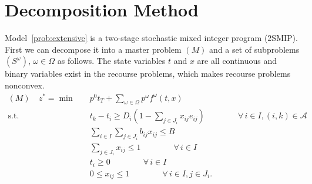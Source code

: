 \documentclass[11pt]{article}
\begin{document}
	\section{Decomposition Method} \label{sec:decomposition}
	Model~\eqref{prob:extensive} is a two-stage stochastic mixed integer program (2SMIP). First we can decompose it into a master problem \((M)\) and a set of subproblems \((S^\omega)\), \(\omega \in \Omega\) as follows. The state variables \(t\) and \(x\) are all continuous and binary variables exist in the recourse problems, which makes recourse problems nonconvex. 
	\begin{subequations}
		\label{prob:masterOri}
		\begin{align}
		(M) \quad z^* = \min \quad &p^0 t_T + \sum_{\omega \in \Omega} p^\omega f^\omega(t,x)\\
		\text{s.t.} \quad & t_k - t_i \geq D_{i}(1 - \sum_{j \in J_i} x_{ij} e_{ij}) \qquad \qquad \forall \,i \in I, (i,k) \in \mathcal{A} \label{cons:MSep}\\
		& \sum_{i \in I} \sum_{j \in J_i} b_{ij}x_{ij} \leq B  \label{cons:MBudget}\\
		& \sum_{j \in J_i} x_{ij} \leq 1  \qquad \qquad \forall \,i \in I \label{cons:MSingleBudget}\\
		& t_i \geq 0 \qquad \qquad \forall \,i \in I\\
		& 0 \leq x_{ij} \leq 1 \qquad \qquad \forall \,i \in I, j \in J_i.
		\end{align}
	\end{subequations}
\end{document}
